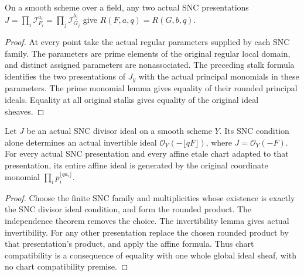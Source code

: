 \begin{theorem}
\label{thm:rounded-snc-original-independent}
\leanok
On a smooth scheme over a field, any two actual SNC presentations
$J=\prod_i\mathcal I_{F_i}^{a_i}=\prod_j\mathcal I_{G_j}^{b_j}$ give
$R(F,a,q)=R(G,b,q)$.
\end{theorem}
\begin{proof}
At every point take the actual regular parameters supplied by each SNC
family. The parameters are prime elements of the original regular local
domain, and distinct assigned parameters are nonassociated. The preceding
stalk formula identifies the two presentations of $J_y$ with the actual
principal monomials in these parameters. The prime monomial lemma gives
equality of their rounded principal ideals. Equality at all original
stalks gives equality of the original ideal sheaves.
\end{proof}

\begin{theorem}
\label{thm:rounded-snc-original-ideal}
\leanok
Let $J$ be an actual SNC divisor ideal on a smooth scheme $Y$. Its SNC
condition alone determines an actual invertible ideal
$\mathcal O_Y(-\lfloor qF\rfloor)$, where $J=\mathcal O_Y(-F)$.
For every actual SNC presentation and every affine etale chart adapted to
that presentation, its entire affine ideal is generated by the original
coordinate monomial $\prod_i p_i^{\lfloor qa_i\rfloor}$.
\end{theorem}
\begin{proof}
Choose the finite SNC family and multiplicities whose existence is exactly
the SNC divisor ideal condition, and form the rounded product. The
independence theorem removes the choice. The invertibility lemma gives
actual invertibility. For any other presentation replace the chosen
rounded product by that presentation's product, and apply the affine
formula. Thus chart compatibility is a consequence of equality with one
whole global ideal sheaf, with no chart compatibility premise.
\end{proof}

